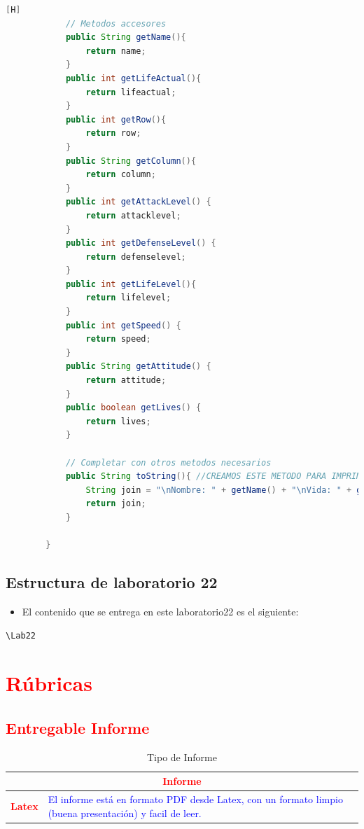 \documentclass{article}
\begin{document}
\begin{lstlisting}[language=java,caption={Las lineas de codigos de la clase Soldado creada:}][H]
			// Metodos accesores
			public String getName(){
				return name;
			}
			public int getLifeActual(){
				return lifeactual;
			}
			public int getRow(){
				return row;
			}
			public String getColumn(){
				return column;
			}
			public int getAttackLevel() {
				return attacklevel;
			}
			public int getDefenseLevel() {
				return defenselevel;
			}
			public int getLifeLevel(){
				return lifelevel;
			}
			public int getSpeed() {
				return speed;
			}
			public String getAttitude() {
				return attitude;
			}
			public boolean getLives() {
				return lives;
			}
		
			// Completar con otros metodos necesarios
			public String toString(){ //CREAMOS ESTE METODO PARA IMPRIMIR LOS DATOS DEl OBJETO
				String join = "\nNombre: " + getName() + "\nVida: " + getLifeActual() + "\nFila: " + getRow() + "\nColumna: " + getColumn() + "\nNivel de ataque: " + getAttackLevel() + "\nNivel de Defensa: " + getDefenseLevel() + "\nNivel de vida: " + getLifeLevel() + "\nVelocidad: " + getSpeed() + "\nActitud: " + getAttitude() + "\nEstado: " + getLives(); //Agregamos un espaciador para poder separar
				return join;
			}
			
		}
	\end{lstlisting}
	\subsection{Estructura de laboratorio 22}
	\begin{itemize}	
		\item El contenido que se entrega en este laboratorio22 es el siguiente:
	\end{itemize}
	\begin{lstlisting}[style=ascii-tree]
	\Lab22
	\end{lstlisting}    
	\section{\textcolor{red}{Rúbricas}}
	
	\subsection{\textcolor{red}{Entregable Informe}}
	\begin{table}[H]
		\caption{Tipo de Informe}
		\setlength{\tabcolsep}{0.5em} %
		{\renewcommand{\arraystretch}{1.5}%
		\begin{tabular}{|p{3cm}|p{12cm}|}
			\hline
			\multicolumn{2}{|c|}{\textbf{\textcolor{red}{Informe}}}  \\
			\hline 
			\textbf{\textcolor{red}{Latex}} & \textcolor{blue}{El informe está en formato PDF desde Latex,  con un formato limpio (buena presentación) y facil de leer.}   \\ 
			\hline 
			
			
		\end{tabular}
	}
	\end{table}
	
\end{document}
